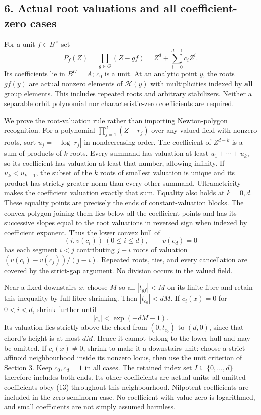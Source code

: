 \documentclass[11pt]{article}
\begin{document}
\subsection{6. Actual root valuations and all coefficient-zero
cases}\label{actual-root-valuations-and-all-coefficient-zero-cases}

For a unit \(f\in B^\times\) set \[
 P_f(Z)=\prod_{g\in G}(Z-gf)
             =Z^d+\sum_{i=0}^{d-1}c_iZ^i.               \tag{11}
\] Its coefficients lie in \(B^G=A\); \(c_0\) is a unit. At an analytic
point \(y\), the roots \(gf(y)\) are actual nonzero elements of
\(\mathcal H(y)\) with multiplicities indexed by \textbf{all} group
elements. This includes repeated roots and arbitrary stabilizers.
Neither a separable orbit polynomial nor characteristic-zero
coefficients are required.

We prove the root-valuation rule rather than importing Newton-polygon
recognition. For a polynomial \(\prod_{j=1}^d(Z-r_j)\) over any valued
field with nonzero roots, sort \(u_j=-\log|r_j|\) in nondecreasing
order. The coefficient of \(Z^{d-k}\) is a sum of products of \(k\)
roots. Every summand has valuation at least \(u_1+\cdots+u_k\), so its
coefficient has valuation at least that number, allowing infinity. If
\(u_k<u_{k+1}\), the subset of the \(k\) roots of smallest valuation is
unique and its product has strictly greater norm than every other
summand. Ultrametricity makes the coefficient valuation exactly that
sum. Equality also holds at \(k=0,d\). These equality points are
precisely the ends of constant-valuation blocks. The convex polygon
joining them lies below all the coefficient points and has its
successive slopes equal to the root valuations in reversed sign when
indexed by coefficient exponent. Thus the lower convex hull of \[
          (i,v(c_i))\ (0\le i\le d),\qquad v(c_d)=0      \tag{12}
\] has each segment \(i<j\) contributing \(j-i\) roots of valuation
\((v(c_i)-v(c_j))/(j-i)\). Repeated roots, ties, and every cancellation
are covered by the strict-gap argument. No division occurs in the valued
field.

Near a fixed downstairs \(x\), choose \(M\) so all \(|t_{gf}|<M\) on its
finite fibre and retain this inequality by full-fibre shrinking. Then
\(|t_{c_0}|<dM\). If \(c_i(x)=0\) for \(0<i<d\), shrink further until \[
                      |c_i|<\exp(-dM-1).                \tag{13}
\] Its valuation lies strictly above the chord from \((0,t_{c_0})\) to
\((d,0)\), since that chord's height is at most \(dM\). Hence it cannot
belong to the lower hull and may be omitted. If \(c_i(x)\ne0\), shrink
to make it a downstairs unit: choose a strict affinoid neighbourhood
inside its nonzero locus, then use the unit criterion of Section 3. Keep
\(c_0,c_d=1\) in all cases. The retained index set
\(I\subseteq\{0,\ldots,d\}\) therefore includes both ends. Its other
coefficients are actual units; all omitted coefficients obey (13)
throughout this neighbourhood. Nilpotent coefficients are included in
the zero-seminorm case. No coefficient with value zero is logarithmed,
and small coefficients are not simply assumed harmless.
\end{document}
